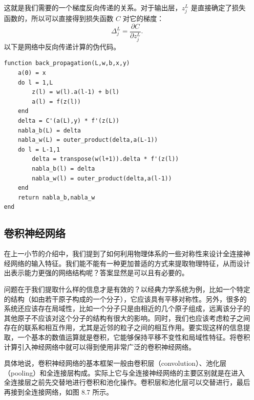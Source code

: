 这就是我们需要的一个梯度反向传递的关系。对于输出层，$z_j^L$ 是直接确定了损失函数的，所以可以直接得到损失函数 $C$ 对它的梯度：
\begin{equation}
\Delta_j^L=\frac{\partial C}{\partial z_j^L}.
\tag{8.3.21}
\end{equation}
以下是网络中反向传递计算的伪代码。

\begin{algorithmBox}
\begin{lstlisting}[style=bellacode]
function back_propagation(L,w,b,x,y)
    a(0) = x
    do l = 1,L
        z(l) = w(l).a(l-1) + b(l)
        a(l) = f(z(l))
    end
    delta = C'(a(L),y) * f'(z(L))
    nabla_b(L) = delta
    nabla_w(L) = outer_product(delta,a(L-1))
    do l = L-1,1
        delta = transpose(w(l+1)).delta * f'(z(l))
        nabla_b(l) = delta
        nabla_w(l) = outer_product(delta,a(l-1))
    end
    return nabla_b,nabla_w
end
\end{lstlisting}
\end{algorithmBox}

\subsection{卷积神经网络}
在上一小节的介绍中，我们提到了如何利用物理体系的一些对称性来设计全连接神经网络的输入特征。我们能不能有一种更加普适的方式来提取物理特征，从而设计出表示能力更强的网络结构呢？答案显然是可以且有必要的。

问题在于我们提取什么样的信息才是有效的？以经典力学系统为例，比如一个特定的结构（如由若干原子构成的一个分子），它应该具有平移对称性。另外，很多的系统还应该存在局域性，比如一个分子只是由相近的几个原子组成，远离该分子的其他原子不应该对这个分子的结构有很大的影响。同时，我们也应该考虑粒子之间存在的联系和相互作用，尤其是近邻的粒子之间的相互作用。要实现这样的信息提取，一个基本的数值运算就是卷积，它能够保持平移不变性和局域性特征。将卷积计算引入神经网络中就可以得到使用非常广泛的卷积神经网络。

具体地说，卷积神经网络的基本框架一般由卷积层（convolution）、池化层（pooling）和全连接层构成。实际上它与全连接神经网络的主要区别就是在进入全连接层之前先交替地进行卷积和池化操作。卷积层和池化层可以交替进行，最后再接到全连接网络，如图 8.7 所示。

